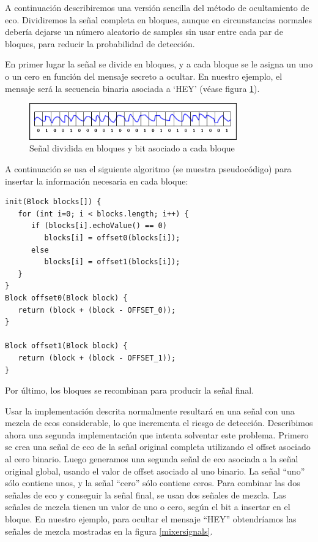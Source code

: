\documentclass[12pt]{article}
\begin{document}
A continuación describiremos una versión sencilla del método de ocultamiento de eco. Dividiremos la señal completa en bloques, aunque en circunstancias normales debería dejarse un número aleatorio de samples sin usar entre cada par de bloques, para reducir la probabilidad de detección.

En primer lugar la señal se divide en bloques, y a cada bloque se le asigna un uno o un cero en función del mensaje secreto a ocultar. En nuestro ejemplo, el mensaje será la secuencia binaria asociada a `HEY' (véase figura \ref{echodividesignal}).

\begin{figure}
  \centering
    \includegraphics[width=0.8\textwidth]{img/echodividesignal}
  \caption{Señal dividida en bloques y bit asociado a cada bloque}
  \label{echodividesignal}
\end{figure}

A continuación se usa el siguiente algoritmo (se muestra pseudocódigo) para insertar la información necesaria en cada bloque:

\begin{lstlisting}[style=mycode]
init(Block blocks[]) { 
   for (int i=0; i < blocks.length; i++) { 
      if (blocks[i].echoValue() == 0) 
         blocks[i] = offset0(blocks[i]); 
      else 
         blocks[i] = offset1(blocks[i]); 
   } 
}
Block offset0(Block block) { 
   return (block + (block - OFFSET_0)); 
}

Block offset1(Block block) { 
   return (block + (block - OFFSET_1)); 
}
\end{lstlisting}

Por último, los bloques se recombinan para producir la señal final.

Usar la implementación descrita normalmente resultará en una señal con una mezcla de ecos considerable, lo que incrementa el riesgo de detección. Describimos ahora una segunda implementación que intenta solventar este problema. Primero se crea una señal de eco de la señal original completa utilizando el offset asociado al cero binario. Luego generamos una segunda señal de eco asociada a la señal original global, usando el valor de offset asociado al uno binario. La señal ``uno'' sólo contiene unos, y la señal ``cero'' sólo contiene ceros. Para combinar las dos señales de eco y conseguir la señal final, se usan dos señales de mezcla. Las señales de mezcla tienen un valor de uno o cero, según el bit a insertar en el bloque. En nuestro ejemplo, para ocultar el mensaje ``HEY'' obtendríamos las señales de mezcla mostradas en la figura \ref{mixersignals}.
\end{document}
